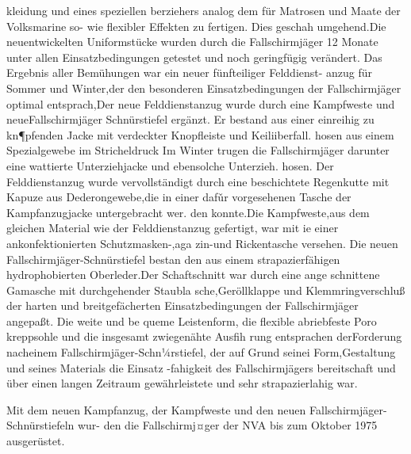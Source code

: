 kleidung und eines speziellen berziehers analog
dem für Matrosen und Maate der Volksmarine so-
wie flexibler Effekten zu fertigen.
Dies geschah umgehend.Die
neuentwickelten
Uniformstücke wurden durch die Fallschirmjäger
12 Monate unter allen Einsatzbedingungen getestet
und noch geringfügig verändert. Das Ergebnis aller
Bemühungen war ein neuer fünfteiliger Felddienst-
anzug für Sommer und Winter,der den besonderen
Einsatzbedingungen der Fallschirmjäger optimal
entsprach,Der neue Felddienstanzug wurde durch
eine Kampfweste und neueFallschirmjäger
Schnürstiefel ergänzt.
Er bestand aus einer einreihig zu kn¶pfenden
Jacke mit verdeckter Knopfleiste und Keiliiberfall.
hosen aus einem Spezialgewebe im Stricheldruck
Im Winter trugen die Fallschirmjäger darunter eine
wattierte Unterziehjacke und ebensolche Unterzieh.
hosen. Der Felddienstanzug wurde vervollständigt
durch eine beschichtete Regenkutte mit Kapuze aus
Dederongewebe,die in einer dafǔr vorgesehenen
Tasche der Kampfanzugjacke untergebracht wer.
den konnte.Die Kampfweste,aus dem gleichen
Material wie der Felddienstanzug gefertigt, war mit
ie einer ankonfektionierten Schutzmasken-,aga
zin-und Rickentasche versehen.
Die neuen Fallschirmjäger-Schnürstiefel bestan
den aus einem strapazierfähigen hydrophobierten
Oberleder.Der Schaftschnitt war durch eine ange
schnittene Gamasche mit durchgehender Staubla
sche,Geröllklappe und Klemmringverschluß der
harten und breitgefächerten Einsatzbedingungen
der Fallschirmjäger angepaßt. Die weite und be
queme Leistenform, die flexible abriebfeste Poro
kreppsohle und die insgesamt zwiegenähte Ausfih
rung entsprachen derForderung nacheinem
Fallschirmjäger-Schn¼rstiefel, der auf Grund seinei
Form,Gestaltung und seines Materials die Einsatz
-fahigkeit des Fallschirmjägers
bereitschaft und
über einen langen Zeitraum gewährleistete und sehr
strapazierlahig war.

Mit dem neuen Kampfanzug, der Kampfweste
und den neuen Fallschirmjäger-Schnürstiefeln wur-
den die Fallschirmj¤ger der NVA bis zum Oktober
1975 ausgerüstet.
